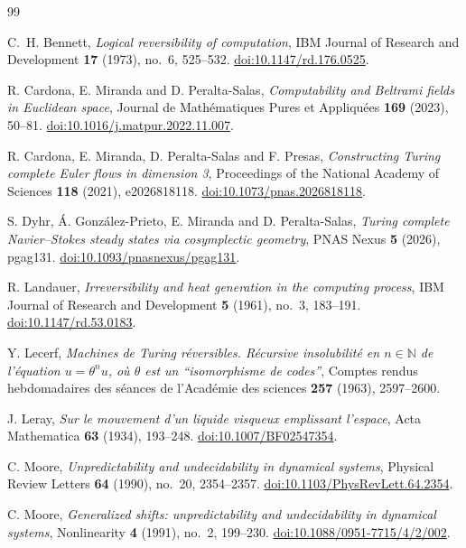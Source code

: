 \begin{thebibliography}{99}
\raggedright
{}
C.~H. Bennett,
\emph{Logical reversibility of computation},
IBM Journal of Research and Development \textbf{17} (1973), no.~6,
525--532.
\href{https://doi.org/10.1147/rd.176.0525}{doi:10.1147/rd.176.0525}.

R. Cardona, E. Miranda and D. Peralta-Salas,
\emph{Computability and Beltrami fields in Euclidean space},
Journal de Math\'ematiques Pures et Appliqu\'ees \textbf{169} (2023),
50--81.
\href{https://doi.org/10.1016/j.matpur.2022.11.007}{doi:10.1016/j.matpur.2022.11.007}.

R. Cardona, E. Miranda, D. Peralta-Salas and F. Presas,
\emph{Constructing Turing complete Euler flows in dimension 3},
Proceedings of the National Academy of Sciences \textbf{118} (2021),
e2026818118.
\href{https://doi.org/10.1073/pnas.2026818118}{doi:10.1073/pnas.2026818118}.

S. Dyhr, \'A. Gonz\'alez-Prieto, E. Miranda and D. Peralta-Salas,
\emph{Turing complete Navier--Stokes steady states via cosymplectic geometry},
PNAS Nexus \textbf{5} (2026), pgag131.
\href{https://doi.org/10.1093/pnasnexus/pgag131}{doi:10.1093/pnasnexus/pgag131}.

R. Landauer,
\emph{Irreversibility and heat generation in the computing process},
IBM Journal of Research and Development \textbf{5} (1961), no.~3,
183--191.
\href{https://doi.org/10.1147/rd.53.0183}{doi:10.1147/rd.53.0183}.

Y. Lecerf,
\emph{Machines de Turing r\'eversibles. R\'ecursive insolubilit\'e en
$n\in\mathbb N$ de l'\'equation $u=\theta^n u$, o\`u $\theta$ est un
``isomorphisme de codes''},
Comptes rendus hebdomadaires des s\'eances de l'Acad\'emie des sciences
\textbf{257} (1963), 2597--2600.

J. Leray,
\emph{Sur le mouvement d'un liquide visqueux emplissant l'espace},
Acta Mathematica \textbf{63} (1934), 193--248.
\href{https://doi.org/10.1007/BF02547354}{doi:10.1007/BF02547354}.

C. Moore, \emph{Unpredictability and undecidability in dynamical systems},
Physical Review Letters \textbf{64} (1990), no.~20, 2354--2357.
\href{https://doi.org/10.1103/PhysRevLett.64.2354}{doi:10.1103/PhysRevLett.64.2354}.

C. Moore,
\emph{Generalized shifts: unpredictability and undecidability in
dynamical systems},
Nonlinearity \textbf{4} (1991), no.~2, 199--230.
\href{https://doi.org/10.1088/0951-7715/4/2/002}{doi:10.1088/0951-7715/4/2/002}.


\end{thebibliography}
